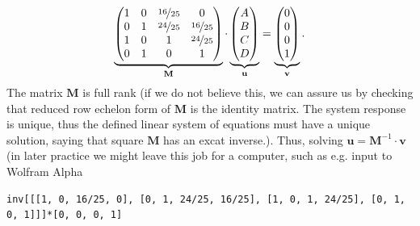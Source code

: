 %
%
%
\begin{align}
\underbrace{
\begin{pmatrix}
1 & 0 & \nicefrac{16}{25} & 0\\
0 & 1 & \nicefrac{24}{25} & \nicefrac{16}{25}\\
1 & 0 & 1 & \nicefrac{24}{25}\\
0 & 1 & 0 & 1
\end{pmatrix}
}_{\mathbf{M}}
\cdot
\underbrace{
\begin{pmatrix}
A \\
B\\
C\\
D
\end{pmatrix}
}_{\mathbf{u}}
=
\underbrace{
\begin{pmatrix}
0\\
0\\
0\\
1
\end{pmatrix}
}_{\mathbf{v}}
.
\end{align}
%
The matrix $\mathbf{M}$ is full rank (if we do not believe this, we can assure
us by checking that reduced row echelon form of $\mathbf{M}$ is the identity matrix.
The system response is unique, thus the defined linear system of equations must
have a unique solution, saying that square $\mathbf{M}$ has an excat inverse.).
%
Thus, solving $\mathbf{u} = \mathbf{M}^{-1} \cdot \mathbf{v}$ (in later practice
we might leave this job for a computer, such as e.g. input to Wolfram Alpha
\begin{verbatim}
inv[[[1, 0, 16/25, 0], [0, 1, 24/25, 16/25], [1, 0, 1, 24/25], [0, 1, 0, 1]]]*[0, 0, 0, 1]
\end{verbatim}
